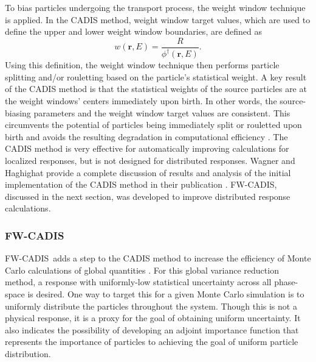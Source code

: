 \documentclass{article} %
\newcommand{\vecr}{\textbf{r}}
\newcommand{\fwc}{\mbox{FW-CADIS}}
\begin{document}
To bias particles undergoing the transport process, the weight window
technique is applied. In the CADIS method, weight window target values, which
are used to define the upper and lower weight window boundaries, are defined
as
%
\begin{equation}
w(\vecr,E) 
= \frac{R}{\phi^{\dagger}(\vecr,E)}.
\label{eq:cadis_tb}
\end{equation}
%
Using this definition, the weight window technique then performs particle
splitting and/or rouletting based on the particle's statistical weight. A key
result of the CADIS method is that the statistical weights of the source
particles are at the weight windows' centers immediately upon birth. In other
words, the source-biasing parameters and the weight window target values are
consistent. This circumvents the potential of particles being immediately
split or rouletted upon birth and avoids the resulting degradation in
computational efficiency \cite{cadis}. The CADIS method is very effective for
automatically improving calculations for localized responses, but is not
designed for distributed responses. Wagner and Haghighat provide a complete
discussion of results and analysis of the initial implementation of the CADIS
method in their publication \cite{cadis}. \fwc, discussed in the next section,
was developed to improve distributed response calculations.

\subsubsection{\fwc}

\fwc\ adds a step to the CADIS method to increase the efficiency of Monte
Carlo calculations of global quantities \cite{fwcadis}.
For this global variance reduction method,
a response with uniformly-low statistical uncertainty across all phase-space
is desired. One way to target this for a given Monte Carlo simulation is to
uniformly distribute the particles throughout the system. Though this is not a
physical response, it is a proxy for the goal of obtaining uniform
uncertainty. It also indicates the possibility of developing an adjoint
importance function that represents the importance of particles to achieving
the goal of uniform particle distribution.
\end{document}

